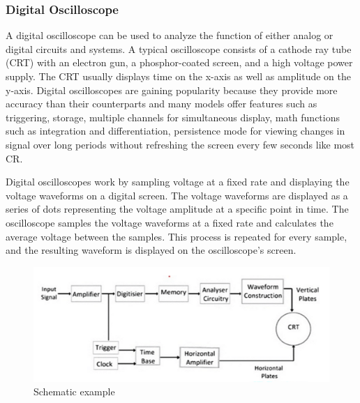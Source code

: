 \subsubsection*{Digital Oscilloscope}
A digital oscilloscope can be used to analyze the function of either analog or digital circuits and systems. A typical oscilloscope consists of a cathode ray tube (CRT) with an electron gun, a phosphor-coated screen, and a high voltage power supply. The CRT usually displays time on the x-axis as well as amplitude on the y-axis. Digital oscilloscopes are gaining popularity because they provide more accuracy than their counterparts and many models offer features such as triggering, storage, multiple channels for simultaneous display, math functions such as integration and differentiation, persistence mode for viewing changes in signal over long periods without refreshing the screen every few seconds like most CR.

Digital oscilloscopes work by sampling voltage at a fixed rate and displaying the voltage waveforms on a digital screen. The voltage waveforms are displayed as a series of dots representing the voltage amplitude at a specific point in time. The oscilloscope samples the voltage waveforms at a fixed rate and calculates the average voltage between the samples. This process is repeated for every sample, and the resulting waveform is displayed on the oscilloscope’s screen.

\begin{figure}[H]
	\centering
	\includegraphics[width=12cm]{images/img_1.png}
	\caption{Schematic example}
	\label{fig:dunno-vol-2}
\end{figure}


















